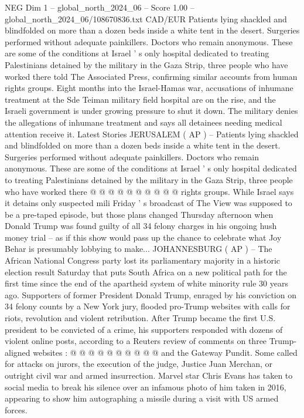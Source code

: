\begin{textsample}{NEG Dim 1 – global\_north\_2024\_06 – Score 1.00 – global\_north\_2024\_06/108670836.txt}  \label{ex:f1_neg_142}
CAD/EUR Patients lying shackled and blindfolded on more than a dozen beds inside a white tent in the desert.
Surgeries performed without adequate painkillers.
Doctors who remain anonymous.
These are some of the conditions at Israel ' s only hospital dedicated to treating Palestinians detained by the military in the Gaza Strip, three people who have worked there told The Associated Press, confirming similar accounts from human rights groups.
Eight months into the Israel-Hamas war, accusations of inhumane treatment at the Sde Teiman military field hospital are on the rise, and the Israeli government is under growing pressure to shut it down.
The military denies the allegations of inhumane treatment and says all detainees needing medical attention receive it.
Latest Stories JERUSALEM ( AP ) -- Patients lying shackled and blindfolded on more than a dozen beds inside a white tent in the desert.
Surgeries performed without adequate painkillers.
Doctors who remain anonymous.
These are some of the conditions at Israel ' s only hospital dedicated to treating Palestinians detained by the military in the Gaza Strip, three people who have worked there @ @ @ @ @ @ @ @ @ @ rights groups.
While Israel says it detains only suspected mili Friday ' s broadcast of The View was supposed to be a pre-taped episode, but those plans changed Thursday afternoon when Donald Trump was found guilty of all 34 felony charges in his ongoing hush money trial -- as if this show would pass up the chance to celebrate what Joy Behar is presumably lobbying to make...
JOHANNESBURG ( AP ) -- The African National Congress party lost its parliamentary majority in a historic election result Saturday that puts South Africa on a new political path for the first time since the end of the apartheid system of white minority rule 30 years ago.
Supporters of former President Donald Trump, enraged by his conviction on 34 felony counts by a New York jury, flooded pro-Trump websites with calls for riots, revolution and violent retribution.
After Trump became the first U.S. president to be convicted of a crime, his supporters responded with dozens of violent online posts, according to a Reuters review of comments on three Trump-aligned websites : @ @ @ @ @ @ @ @ @ @ and the Gateway Pundit.
Some called for attacks on jurors, the execution of the judge, Justice Juan Merchan, or outright civil war and armed insurrection.
Marvel star Chris Evans has taken to social media to break his silence over an infamous photo of him taken in 2016, appearing to show him autographing a missile during a visit with US armed forces.

\end{textsample}
